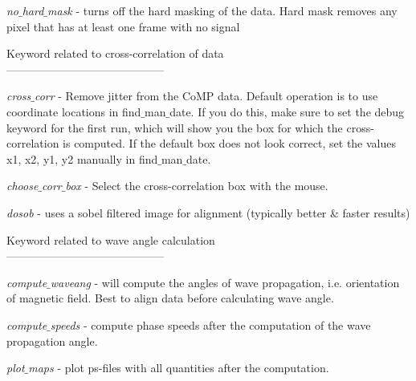 \documentclass{article}
\begin{document}
\textit{no$\_$hard$\_$mask}    - turns off the hard masking of the data. Hard mask removes any pixel that has at least one frame
                  with no signal\\
\smallskip

Keyword related to cross-correlation of data\\
------------------------------------------\\
\smallskip

\textit{cross$\_$corr}      - Remove jitter from the CoMP data. Default operation is
                  to use coordinate locations in find$\_$man$\_$date. If
                  you do this, make sure to set the debug
                  keyword for the first run, which will show
                  you the box for which the cross-correlation 
                  is computed. If the default box does not look 
                  correct, set the values x1, x2, y1, y2
                  manually in find$\_$man$\_$date.  \\
\smallskip

\textit{choose$\_$corr$\_$box} - Select the cross-correlation box with
                  the mouse.\\
\smallskip

\textit{dosob}           - uses a sobel filtered image for alignment (typically better \& faster results)\\
\smallskip

Keyword related to wave angle calculation\\
------------------------------------------\\

\smallskip

\textit{compute$\_$waveang} - will compute the angles of wave propagation, i.e. orientation of magnetic field.
                  Best to align data before calculating wave angle.\\
\smallskip

\textit{compute$\_$speeds}  - compute phase speeds after the
                  computation of the wave propagation
                  angle. \\
\smallskip

\textit{plot$\_$maps}       - plot ps-files with all quantities after the
                  computation.\\
\smallskip                
             
\end{document}
